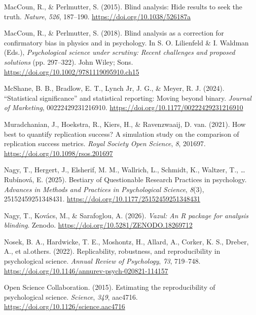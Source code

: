 \documentclass[
  english,
  man,floatsintext]{apa6}
\newlength{\cslhangindent}
\newenvironment{CSLReferences}[2] %
 {\begin{list}{}{%
  \setlength{\itemindent}{0pt}
  \setlength{\leftmargin}{0pt}
  \setlength{\parsep}{0pt}
  \ifodd #1
   \setlength{\leftmargin}{\cslhangindent}
   \setlength{\itemindent}{-1\cslhangindent}
  \fi
  \setlength{\itemsep}{#2\baselineskip}}}
 {\end{list}}
\begin{document}
\begin{CSLReferences}{1}{0}
MacCoun, R., \& Perlmutter, S. (2015). Blind analysis: {H}ide results to seek the truth. \emph{Nature}, \emph{526}, 187--190. \url{https://doi.org/10.1038/526187a}

MacCoun, R., \& Perlmutter, S. (2018). Blind analysis as a correction for confirmatory bias in physics and in psychology. In S. O. Lilienfeld \& I. Waldman (Eds.), \emph{Psychological science under scrutiny: {R}ecent challenges and proposed solutions} (pp. 297--322). John Wiley; Sons. \url{https://doi.org/10.1002/9781119095910.ch15}

McShane, B. B., Bradlow, E. T., Lynch Jr, J. G., \& Meyer, R. J. (2024). {``Statistical significance''} and statistical reporting: Moving beyond binary. \emph{Journal of Marketing}, 00222429231216910. \url{https://doi.org/10.1177/00222429231216910}

Muradchanian, J., Hoekstra, R., Kiers, H., \& Ravenzwaaij, D. van. (2021). How best to quantify replication success? {A} simulation study on the comparison of replication success metrics. \emph{Royal Society Open Science}, \emph{8}, 201697. \url{https://doi.org/10.1098/rsos.201697}

Nagy, T., Hergert, J., Elsherif, M. M., Wallrich, L., Schmidt, K., Waltzer, T., \ldots{} Rubínová, E. (2025). Bestiary of {Questionable} {Research} {Practices} in psychology. \emph{Advances in Methods and Practices in Psychological Science}, \emph{8}(3), 25152459251348431. \url{https://doi.org/10.1177/25152459251348431}

Nagy, T., Kovács, M., \& Sarafoglou, A. (2026). \emph{Vazul: An {R} package for analysis blinding}. Zenodo. \url{https://doi.org/10.5281/ZENODO.18269712}

{Nosek, B. A., Hardwicke, T. E., Moshontz, H., Allard, A., Corker, K. S., Dreber, A., et al.others}. (2022). Replicability, robustness, and reproducibility in psychological science. \emph{Annual Review of Psychology}, \emph{73}, 719--748. \url{https://doi.org/10.1146/annurev-psych-020821-114157}

Open Science Collaboration. (2015). Estimating the reproducibility of psychological science. \emph{Science}, \emph{349}, aac4716. \url{https://doi.org/10.1126/science.aac4716}


\end{CSLReferences}
\end{document}
